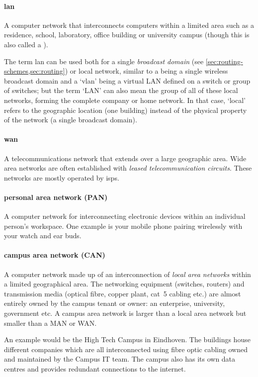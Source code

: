 {\paragraph{\gls{lan}}%
A computer network that interconnects computers within a limited area such as a residence, school, laboratory, office building or university campus (though this is also called a ).

The term \gls{lan} can be used both for a single \emph{broadcast domain} (see \vref{sec:routing-schemes,sec:routing}) or local network, similar to a  being a single wireless broadcast domain and a `\gls{vlan}' being a virtual LAN defined on a switch or group of switches; but the term `LAN' can also mean the group of all of these local networks, forming the complete company or home network.
In that case, `local' refers to the geographic location (one building) instead of the physical property of the network (a single broadcast domain).

\paragraph{\gls{wan}}
A telecommunications network that extends over a large geographic area.
Wide area networks are often established with \emph{leased telecommunication circuits}.
These networks are mostly operated by \glspl{isp}.

\paragraph{personal area network (PAN)}
A computer network for interconnecting electronic devices within an individual person's workspace.
One example is your mobile phone pairing wirelessly with your watch and ear buds.

\paragraph{campus area network (CAN)}
A computer network made up of an interconnection of \emph{local area networks} within a limited geographical area.
The networking equipment (switches, routers) and transmission media (optical fibre, copper plant, cat~5 cabling etc.) are almost entirely owned by the campus tenant or owner: an enterprise, university, government etc.
A campus area network is larger than a local area network but smaller than a MAN or WAN.

An example would be the High Tech Campus in Eindhoven.
The buildings house different companies which are all interconnected using fibre optic cabling owned and maintained by the Campus IT team.
The campus also has its own data centres and provides redundant connections to the internet.

}
